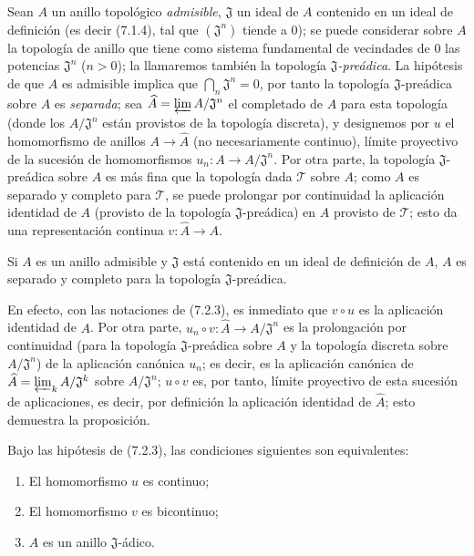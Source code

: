 \begin{env}[7.2.3]
\label{0.7.2.3-fr}
Sean $A$ un anillo topológico \emph{admisible}, $\mathfrak J$ un ideal de $A$
contenido en un ideal de definición (es decir (7.1.4), tal que
$(\mathfrak J^n)$ tiende a $0$); se puede considerar sobre $A$ la topología
de anillo que tiene como sistema fundamental de vecindades de $0$ las potencias
$\mathfrak J^n$ ($n>0$); la llamaremos también la topología
\emph{$\mathfrak J$-preádica}. La hipótesis de que $A$ es admisible implica que
$\bigcap_n\mathfrak J^n=0$, por tanto la topología $\mathfrak J$-preádica sobre $A$
es \emph{separada}; sea
$\widehat A=\varprojlim A/\mathfrak J^n$ el completado de $A$ para esta topología
(donde los $A/\mathfrak J^n$ están provistos de la topología discreta), y designemos
por $u$ el homomorfismo de anillos $A\to\widehat A$ (no necesariamente
continuo), límite proyectivo de la sucesión de homomorfismos
$u_n:A\to A/\mathfrak J^n$. Por otra parte, la topología $\mathfrak J$-preádica
sobre $A$ es más fina que la topología dada $\mathcal T$ sobre $A$; como $A$
es separado y completo para $\mathcal T$, se puede prolongar por continuidad
la aplicación identidad de $A$ (provisto de la topología $\mathfrak J$-preádica)
en $A$ provisto de $\mathcal T$; esto da una representación continua
$v:\widehat A\to A$.
\end{env}

\begin{proposition}[7.2.4]
\label{0.7.2.4-fr}
Si $A$ es un anillo admisible y $\mathfrak J$ está contenido en un ideal de
definición de $A$, $A$ es separado y completo para la topología
$\mathfrak J$-preádica.
\end{proposition}

En efecto, con las notaciones de (7.2.3), es inmediato que $v\circ u$ es
la aplicación identidad de $A$. Por otra parte,
$u_n\circ v:\widehat A\to A/\mathfrak J^n$ es la prolongación por continuidad
(para la topología $\mathfrak J$-preádica sobre $A$ y la topología discreta sobre
$A/\mathfrak J^n$) de la aplicación canónica $u_n$; es decir, es
la aplicación canónica de
$\widehat A=\varprojlim_k A/\mathfrak J^k$ sobre $A/\mathfrak J^n$;
$u\circ v$ es, por tanto, límite proyectivo de esta sucesión de aplicaciones,
es decir, por definición la aplicación identidad de $\widehat A$; esto
demuestra la proposición.

\begin{corollary}[7.2.5]
\label{0.7.2.5-fr}
Bajo las hipótesis de \textup{(7.2.3)}, las condiciones siguientes son equivalentes:
\begin{enumerate}
  \item[{\upshape a)}] El homomorfismo $u$ es continuo;


  \item[{\upshape b)}] El homomorfismo $v$ es bicontinuo;
  \item[{\upshape c)}] $A$ es un anillo $\mathfrak J$-ádico.
\end{enumerate}
\end{corollary}

